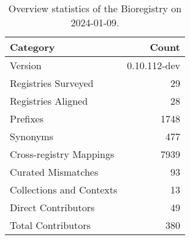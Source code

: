 \begin{table}
\caption{Overview statistics of the Bioregistry on 2024-01-09.}
\label{tab:bioregistry-summary}
\begin{tabular}{lr}
\toprule
Category & Count \\
\midrule
Version & 0.10.112-dev \\
Registries Surveyed & 29 \\
Registries Aligned & 28 \\
Prefixes & 1748 \\
Synonyms & 477 \\
Cross-registry Mappings & 7939 \\
Curated Mismatches & 93 \\
Collections and Contexts & 13 \\
Direct Contributors & 49 \\
Total Contributors & 380 \\
\bottomrule
\end{tabular}
\end{table}
